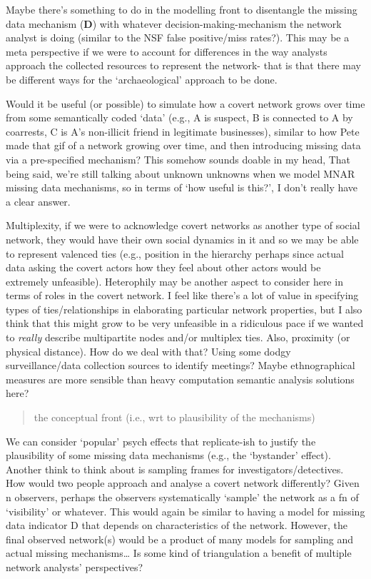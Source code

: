 \documentclass[
]{article}
\begin{document}
Maybe there's something to do in the modelling front to disentangle the
missing data mechanism (\(\mathbf{D}\)) with whatever
decision-making-mechanism the network analyst is doing (similar to the
NSF false positive/miss rates?). This may be a meta perspective if we
were to account for differences in the way analysts approach the
collected resources to represent the network- that is that there may be
different ways for the `archaeological' approach to be done.

Would it be useful (or possible) to simulate how a covert network grows
over time from some semantically coded `data' (e.g., A is suspect, B is
connected to A by coarrests, C is A's non-illicit friend in legitimate
businesses), similar to how Pete made that gif of a network growing over
time, and then introducing missing data via a pre-specified mechanism?
This somehow sounds doable in my head, That being said, we're still
talking about unknown unknowns when we model MNAR missing data
mechanisms, so in terms of `how useful is this?', I don't really have a
clear answer.

Multiplexity, if we were to acknowledge covert networks as another type
of social network, they would have their own social dynamics in it and
so we may be able to represent valenced ties (e.g., position in the
hierarchy perhaps since actual data asking the covert actors how they
feel about other actors would be extremely unfeasible). Heterophily may
be another aspect to consider here in terms of roles in the covert
network. I feel like there's a lot of value in specifying types of
ties/relationships in elaborating particular network properties, but I
also think that this might grow to be very unfeasible in a ridiculous
pace if we wanted to \emph{really} describe multipartite nodes and/or
multiplex ties. Also, proximity (or physical distance). How do we deal
with that? Using some dodgy surveillance/data collection sources to
identify meetings? Maybe ethnographical measures are more sensible than
heavy computation semantic analysis solutions here?

\begin{quote}
the conceptual front (i.e., wrt to plausibility of the mechanisms)
\end{quote}

We can consider `popular' psych effects that replicate-ish to justify
the plausibility of some missing data mechanisms (e.g., the `bystander'
effect). Another think to think about is sampling frames for
investigators/detectives. How would two people approach and analyse a
covert network differently? Given n observers, perhaps the observers
systematically `sample' the network as a fn of `visibility' or whatever.
This would again be similar to having a model for missing data indicator
D that depends on characteristics of the network. However, the final
observed network(s) would be a product of many models for sampling and
actual missing mechanisms\ldots{} Is some kind of triangulation a
benefit of multiple network analysts' perspectives?
\end{document}
